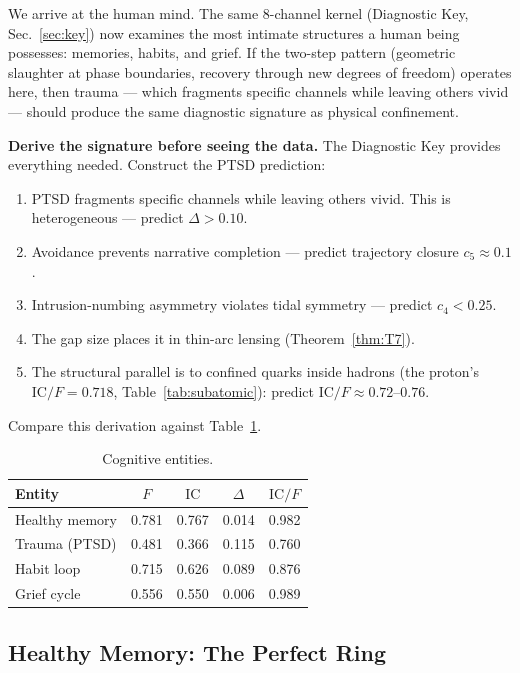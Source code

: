 \documentclass[
  aps,
  prd,
  twocolumn,
  superscriptaddress,
  nofootinbib,
  floatfix
]{revtex4-2}
\newcommand{\IC}{\mathrm{IC}}
\begin{document}
We arrive at the human mind.  The same 8-channel kernel
(Diagnostic Key, Sec.~\ref{sec:key}) now examines the most
intimate structures a human being possesses: memories,
habits, and grief.  If the two-step pattern
(geometric slaughter at phase boundaries, recovery through
new degrees of freedom) operates here, then trauma ---
which fragments specific channels while leaving others
vivid --- should produce the same diagnostic signature
as physical confinement.

\textbf{Derive the signature before seeing the data.}
The Diagnostic Key provides everything needed.  Construct
the PTSD prediction:
\begin{enumerate}
\item PTSD fragments specific channels while leaving others
  vivid.  This is heterogeneous --- predict $\Delta > 0.10$.
\item Avoidance prevents narrative completion --- predict
  trajectory closure $c_5 \approx 0.1$.
\item Intrusion-numbing asymmetry violates tidal symmetry ---
  predict $c_4 < 0.25$.
\item The gap size places it in thin-arc lensing
  (Theorem~\ref{thm:T7}).
\item The structural parallel is to confined quarks inside
  hadrons (the proton's $\IC/F = 0.718$,
  Table~\ref{tab:subatomic}): predict $\IC/F \approx
  0.72$--$0.76$.
\end{enumerate}
Compare this derivation against Table~\ref{tab:cognitive}.

\begin{table}[!htbp]
\caption{\label{tab:cognitive}Cognitive entities.}
\begin{ruledtabular}
\begin{tabular}{lcccc}
Entity & $F$ & $\IC$ & $\Delta$ & $\IC/F$ \\
\hline
Healthy memory     & 0.781 & 0.767 & 0.014 & 0.982 \\
Trauma (PTSD)      & 0.481 & 0.366 & 0.115 & 0.760 \\
Habit loop         & 0.715 & 0.626 & 0.089 & 0.876 \\
Grief cycle        & 0.556 & 0.550 & 0.006 & 0.989 \\
\end{tabular}
\end{ruledtabular}
\end{table}


\subsection{Healthy Memory: The Perfect Ring}
\end{document}
